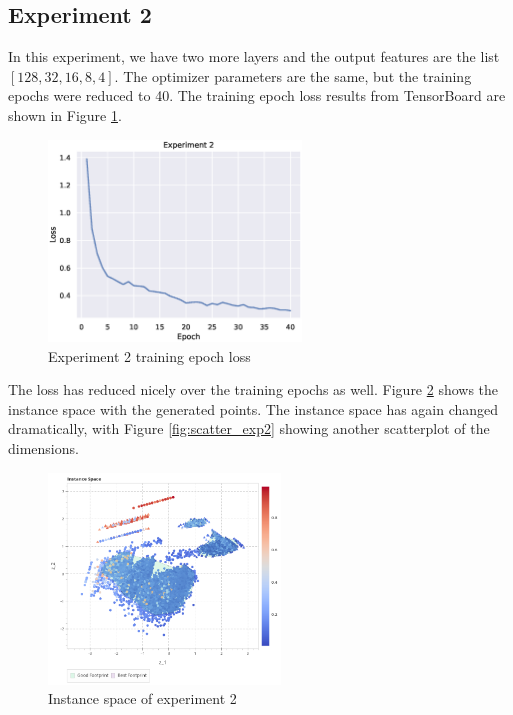 \subsection{Experiment 2}

In this experiment, we have two more layers and the output features are the list $[128, 32, 16, 8, 4]$. The optimizer parameters are the same, but the training epochs were reduced to 40. The training epoch loss results from TensorBoard are shown in Figure \ref{fig:exp2}.

\begin{figure}[H]
    \centering
    \includegraphics[width=0.6\textwidth]{Cap5/loss_exp2}
    \caption{Experiment 2 training epoch loss}
    \label{fig:exp2}
\end{figure}

The loss has reduced nicely over the training epochs as well. Figure \ref{fig:is_exp2} shows the instance space with the generated points. The instance space has again changed dramatically, with Figure \ref{fig:scatter_exp2} showing another scatterplot of the dimensions.

\begin{figure}[H]
    \centering
    \includegraphics[width=0.55\textwidth]{Cap5/is_exp2.png}
    \caption{Instance space of experiment 2}
    \label{fig:is_exp2}
\end{figure}

